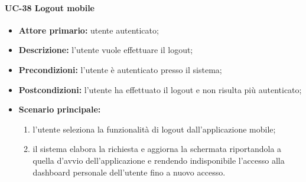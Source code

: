 \paragraph{UC-38 Logout mobile}

	\begin{itemize}
		\item \textbf{Attore primario:} utente autenticato;

		\item \textbf{Descrizione:} l'utente vuole effettuare il logout;

		\item \textbf{Precondizioni:} l'utente è autenticato presso il sistema;

		\item \textbf{Postcondizioni:} l'utente ha effettuato il logout e non risulta più autenticato;

		\item \textbf{Scenario principale:}
	  		\begin{enumerate}
		  		\item l'utente seleziona la funzionalità di logout dall'applicazione mobile;
		  		\item il sistema elabora la richiesta e aggiorna la schermata riportandola a quella d'avvio dell'applicazione e rendendo indisponibile l'accesso alla dashboard personale dell'utente fino a nuovo accesso.
	  		\end{enumerate}
	\end{itemize}